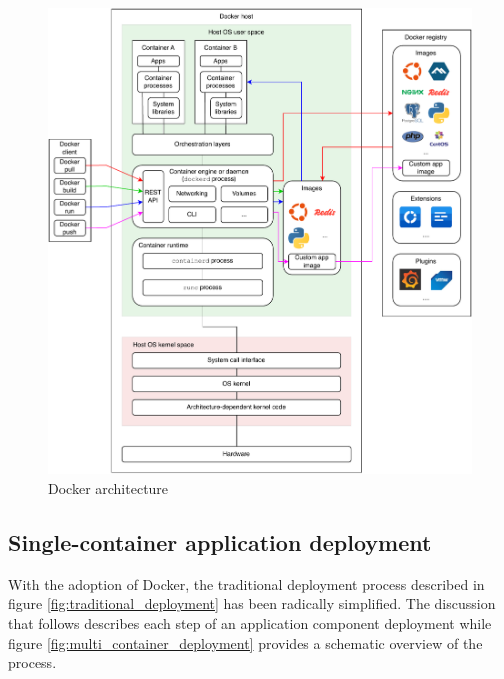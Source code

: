 \begin{figure}[htbp]
    \vspace{10pt}
    \centering
    \includegraphics[width=1\textwidth]{assets/docker.pdf}
    \caption{Docker architecture}
    \label{fig:docker_architecture}
    \vspace{10pt}
\end{figure}

\subsection{Single-container application deployment}
With the adoption of Docker, the traditional deployment process described in figure \ref{fig:traditional_deployment} has been radically simplified. The discussion that follows describes each step of an application component deployment while figure \ref{fig:multi_container_deployment} provides a schematic overview of the process.

